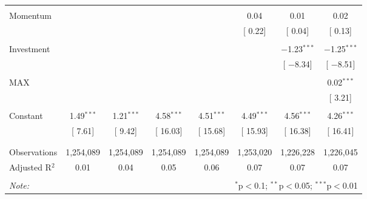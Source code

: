 \documentclass[12pt]{article}
\begin{document}
\begin{table}[!htbp]
\begin{tabular}{@{\extracolsep{0pt}}lccccccc}
  & & & & & & & \\ 
 Momentum &  &  &  &  & 0.04 & 0.01 & 0.02 \\ 
  &  &  &  &  & [ 0.22] & [ 0.04] & [ 0.13] \\ 
  & & & & & & & \\ 
 Investment &  &  &  &  &  & $-$1.23$^{***}$ & $-$1.25$^{***}$ \\ 
  &  &  &  &  &  & [ $-$8.34] & [ $-$8.51] \\ 
  & & & & & & & \\ 
 MAX &  &  &  &  &  &  & 0.02$^{***}$ \\ 
  &  &  &  &  &  &  & [ 3.21] \\ 
  & & & & & & & \\ 
 Constant & 1.49$^{***}$ & 1.21$^{***}$ & 4.58$^{***}$ & 4.51$^{***}$ & 4.49$^{***}$ & 4.56$^{***}$ & 4.26$^{***}$ \\ 
  & [ 7.61] & [ 9.42] & [ 16.03] & [ 15.68] & [ 15.93] & [ 16.38] & [ 16.41] \\ 
  & & & & & & & \\ 
\hline \\[-1.8ex] 
Observations & 1,254,089 & 1,254,089 & 1,254,089 & 1,254,089 & 1,253,020 & 1,226,228 & 1,226,045 \\ 
Adjusted R$^{2}$ & 0.01 & 0.04 & 0.05 & 0.06 & 0.07 & 0.07 & 0.07 \\ 
\hline 
\hline \\[-1.8ex] 
\textit{Note:}  & \multicolumn{7}{r}{$^{*}$p$<$0.1; $^{**}$p$<$0.05; $^{***}$p$<$0.01} \\ 
\end{tabular} 
\end{table}


\clearpage
\end{document}
